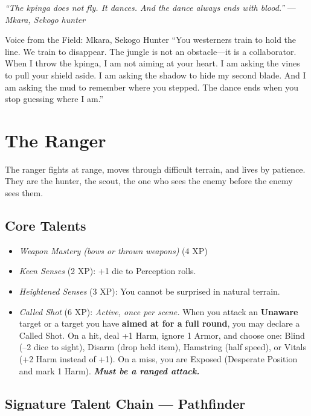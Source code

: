 \documentclass[9pt,a5paper]{extbook}
\begin{document}
\vspace{0.2cm}
\noindent\textit{``The kpinga does not fly. It dances. And the dance always ends with blood.''}  
\hfill --- \textit{Mkara, Sekogo hunter}

\begin{warriorbox}{Voice from the Field: Mkara, Sekogo Hunter}
``You westerners train to hold the line. We train to disappear. The jungle is not an obstacle---it is a collaborator. When I throw the kpinga, I am not aiming at your heart. I am asking the vines to pull your shield aside. I am asking the shadow to hide my second blade. And I am asking the mud to remember where you stepped. The dance ends when you stop guessing where I am.''
\end{warriorbox}

\clearpage

\section{The Ranger}

The ranger fights at range, moves through difficult terrain, and lives by patience. They are the hunter, the scout, the one who sees the enemy before the enemy sees them.

\subsection{Core Talents}
\begin{itemize}
    \item \textit{Weapon Mastery (bows or thrown weapons)} (4 XP)
    \item \textit{Keen Senses} (2 XP): +1 die to Perception rolls.
    \item \textit{Heightened Senses} (3 XP): You cannot be surprised in natural terrain.
    \item \textit{Called Shot} (6 XP): \textit{Active, once per scene.} When you attack an \textbf{Unaware} target or a target you have \textbf{aimed at for a full round}, you may declare a Called Shot. On a hit, deal +1 Harm, ignore 1 Armor, and choose one: Blind (--2 dice to sight), Disarm (drop held item), Hamstring (half speed), or Vitals (+2 Harm instead of +1). On a miss, you are Exposed (Desperate Position and mark 1 Harm). \textbf{\textit{Must be a ranged attack.}}

\end{itemize}

\subsection{Signature Talent Chain --- Pathfinder}
\end{document}
